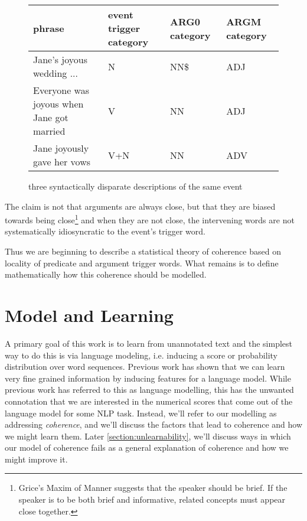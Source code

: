 \documentclass[11pt,letterpaper]{article}
\begin{document}
\begin{figure*}[ht]
\begin{tabular}{ | l | l | l | l | }
\hline
phrase & event trigger category & ARG0 category & ARGM category \\
\hline
Jane's joyous wedding ... & N & NN\$ & ADJ \\
Everyone was joyous when Jane got married & V & NN & ADJ \\
Jane joyously gave her vows & V+N & NN & ADV \\
\hline
\end{tabular}
\caption{three syntactically disparate descriptions of the same event}
\label{eventDesc}
\end{figure*}


The claim is not that arguments are always close, but
that they are biased towards being close\footnote{Grice's Maxim of Manner suggests
that the speaker should be brief. If the speaker is to be both brief and informative,
related concepts must appear close together.}
and when they are not close, the intervening words are not
systematically idiosyncratic to the event's trigger word.

Thus we are beginning to describe a statistical theory of coherence
based on locality of predicate and argument trigger words.
What remains is to define mathematically how this coherence should be modelled.



\section{Model and Learning} %
A primary goal of this work is to learn from unannotated text and
the simplest way to do this is via language modeling, i.e. inducing
a score or probability distribution over word sequences.
Previous work has shown that we can learn very fine grained information
by inducing features for a language model.
While previous work has referred to this as language modelling,
this has the unwanted connotation that we are interested in the
numerical scores that come out of the language model for some NLP task.
Instead, we'll refer to our modelling as addressing {\em coherence},
and we'll discuss the factors that lead to coherence and how we might learn them. 
Later \ref{section:unlearnability}, we'll discuss ways in which our model of coherence
fails as a general explanation of coherence and how we might improve it.
\end{document}
